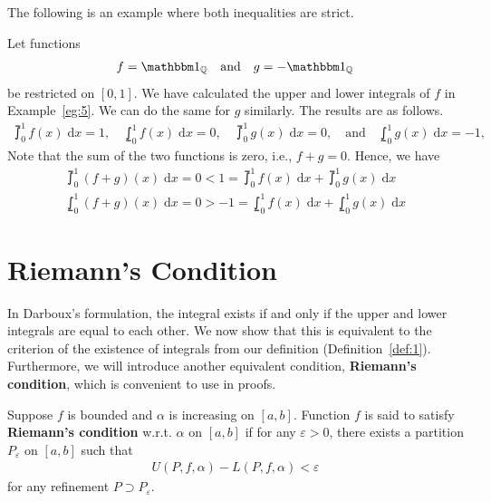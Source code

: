 \documentclass[thmcnt=section, 12pt]{my-elegantbook}
\begin{document}
The following is an example where both inequalities are strict.

\begin{example}
    Let functions
    \begin{align*}
        f = \ind_\Q 
        \quad \text{and} \quad 
        g = -\ind_\Q
    \end{align*}
    be restricted on $[0, 1]$. We have calculated the upper and lower integrals of $f$ in Example~\ref{eg:5}. We can do the same for $g$ similarly. The results are as follows.
    \begin{align*}
        \upint_0^1 f(x) \; \mathrm{d}x = 1,
        \quad 
        \lowint_0^1 f(x) \; \mathrm{d}x = 0,
        \quad
        \upint_0^1 g(x) \; \mathrm{d}x = 0,
        \quad \text{and} \quad
        \lowint_0^1 g(x) \; \mathrm{d}x = -1,
    \end{align*}
    Note that the sum of the two functions is zero, i.e., $f + g = 0$. Hence, we have
    \begin{align*}
        \upint_0^1 (f+g)(x) \; \mathrm{d}x 
        = 0 
        < 1 
        = \upint_0^1 f(x) \; \mathrm{d}x + \upint_0^1 g(x) \; \mathrm{d}x \\
        \lowint_0^1 (f+g)(x) \; \mathrm{d}x 
        = 0
        > -1 
        = \lowint_0^1 f(x) \; \mathrm{d}x + \lowint_0^1 g(x) \; \mathrm{d}x
    \end{align*}
\end{example}


\section{Riemann's Condition}

In Darboux's formulation, the integral exists if and only if the upper and lower integrals are equal to each other. We now show that this is equivalent to the criterion of the existence of integrals from our definition (Definition~\ref{def:1}). Furthermore, we will introduce another equivalent condition, \textbf{Riemann's condition}, which is convenient to use in proofs.

\begin{definition}
    Suppose $f$ is bounded and $\alpha$ is increasing on $[a, b]$. Function $f$ is said to satisfy \textbf{Riemann's condition} w.r.t. $\alpha$ on $[a, b]$ if for any $\varepsilon > 0$, there exists a partition $P_\varepsilon$ on $[a, b]$ such that 
    \begin{align*}
        U(P,f,\alpha) - L(P,f,\alpha) < \varepsilon
    \end{align*}
    for any refinement $P \supset P_\varepsilon$.
\end{definition}
\end{document}
